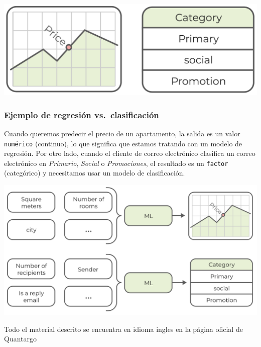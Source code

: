 \documentclass[
]{book}
\begin{document}
\includegraphics{img/reg.png}

\hypertarget{ejemplo-de-regresiuxf3n-vs.-clasificaciuxf3n}{%
\subsubsection{Ejemplo de regresión vs.~clasificación}\label{ejemplo-de-regresiuxf3n-vs.-clasificaciuxf3n}}

Cuando queremos predecir el precio de un apartamento, la salida es un valor \texttt{numérico} (continuo), lo que significa que estamos tratando con un modelo de regresión. Por otro lado, cuando el cliente de correo electrónico clasifica un correo electrónico en \emph{Primario}, \emph{Social} o \emph{Promociones}, el resultado es un \texttt{factor} (categórico) y necesitamos usar un modelo de clasificación.

\includegraphics{img/RCE.png}

Todo el material descrito se encuentra en idioma ingles en la página oficial de Quantargo \citep{quantargo2}

  
\end{document}
